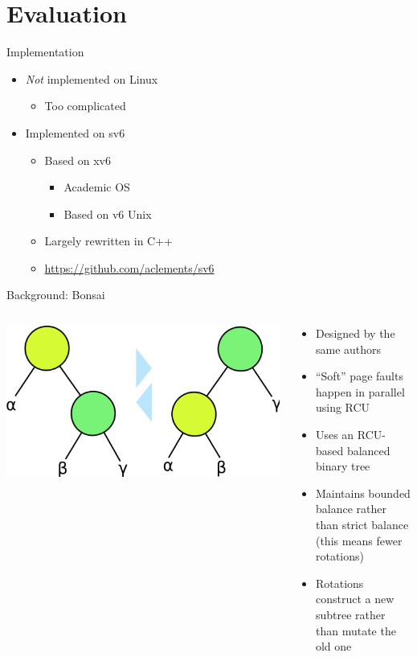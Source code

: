 \documentclass[aspectratio=169]{beamer}
\newcommand{\bi}{\begin{itemize}}
\newcommand{\ei}{\end{itemize}}
\begin{document}
\section{Evaluation}

\begin{frame}{Implementation}
  \begin{center}
    \bi
  \item \emph{Not} implemented on Linux
    \bi
    \pause
  \item Too complicated
    \ei
    \vspace{1em}
    \pause
  \item Implemented on sv6
    \bi
    \pause
  \item Based on xv6
    \bi
  \item Academic OS
  \item Based on v6 Unix
    \ei
  \item Largely rewritten in C++
  \item \url{https://github.com/aclements/sv6}
    \ei
    \ei
  \end{center}
\end{frame}

\begin{frame}{Background: Bonsai}
  \begin{columns}[T]
    \begin{column}{0.6\textwidth}
      \begin{center}
        \includegraphics[scale=0.2]{./figures/Binary_tree_rotation.png}
      \end{center}
    \end{column}
    \begin{column}{0.4\textwidth}
      \bi
    \item Designed by the same authors
    \item ``Soft'' page faults happen in parallel using RCU
    \item Uses an RCU-based balanced binary tree
    \item Maintains bounded balance rather than strict balance\\
      (this means fewer rotations)
    \item Rotations construct a new subtree rather than mutate the old one
      \ei
    \end{column}
  \end{columns}
\end{frame}
\end{document}

